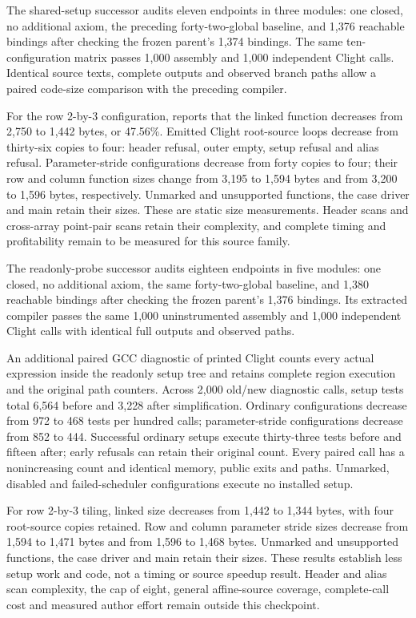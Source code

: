 The shared-setup successor audits eleven endpoints in three modules: one
closed, no additional axiom, the preceding forty-two-global baseline, and
1,376 reachable bindings after checking the frozen parent's 1,374 bindings.
The same ten-configuration matrix passes 1,000 assembly and 1,000 independent
Clight calls. Identical source texts, complete outputs and observed branch
paths allow a paired code-size comparison with the preceding compiler.

For the row 2-by-3 configuration,  reports that the linked
 function decreases from 2,750 to 1,442 bytes, or 47.56\%.
Emitted Clight root-source loops decrease from thirty-six copies to four:
header refusal, outer empty, setup refusal and alias refusal. Parameter-stride
configurations decrease from forty copies to four; their row and column
function sizes change from 3,195 to 1,594 bytes and from 3,200 to 1,596 bytes,
respectively. Unmarked and unsupported functions, the case driver and main
retain their sizes. These are static size measurements. Header scans and
cross-array point-pair scans retain their complexity, and complete timing and
profitability remain to be measured for this source family.

The readonly-probe successor audits eighteen endpoints in five modules: one
closed, no additional axiom, the same forty-two-global baseline, and 1,380
reachable bindings after checking the frozen parent's 1,376 bindings. Its
extracted compiler passes the same 1,000 uninstrumented assembly and 1,000
independent Clight calls with identical full outputs and observed paths.

An additional paired GCC diagnostic of printed Clight counts every actual
 expression inside the readonly setup tree and retains complete region
execution and the original path counters. Across 2,000 old/new diagnostic calls,
setup tests total 6,564 before and 3,228 after simplification. Ordinary
configurations decrease from 972 to 468 tests per hundred calls; parameter-stride
configurations decrease from 852 to 444. Successful ordinary setups execute
thirty-three tests before and fifteen after; early refusals can retain their
original count. Every paired call has a nonincreasing count and identical
memory, public exits and paths. Unmarked, disabled and failed-scheduler
configurations execute no installed setup.

For row 2-by-3 tiling, linked  size decreases from 1,442 to
1,344 bytes, with four root-source copies retained. Row and column parameter
stride sizes decrease from 1,594 to 1,471 bytes and from 1,596 to 1,468 bytes.
Unmarked and unsupported functions, the case driver and main retain their
sizes. These results establish less setup work and code, not a timing or source
speedup result. Header and alias scan complexity, the cap of eight, general
affine-source coverage, complete-call cost and measured author effort remain
outside this checkpoint.

